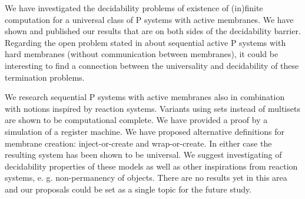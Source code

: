 We have investigated the decidability problems of existence of (in)finite computation for a universal class of P systems with active membranes. We have shown and published our results that are on both sides of the decidability barrier. Regarding the open problem stated in \cite{Ibarra05Active} about sequential active P systems with hard membranes (without communication between membranes), it could be interesting to find a connection between the universality and decidability of these termination problems.

We research sequential P systems with active membranes also in combination with notions inspired by reaction systems. Variants using sets instead of multisets are shown to be computational complete. We have provided a proof by a simulation of a register machine. We have proposed alternative definitions for membrane creation: inject-or-create and wrap-or-create. In either case the resulting system has been shown to be universal. We suggest investigating of decidability properties of these models as well as other inspirations from reaction systems, e. g. non-permanency of objects. There are no results yet in this area and our proposals could be set as a single topic for the future study.

